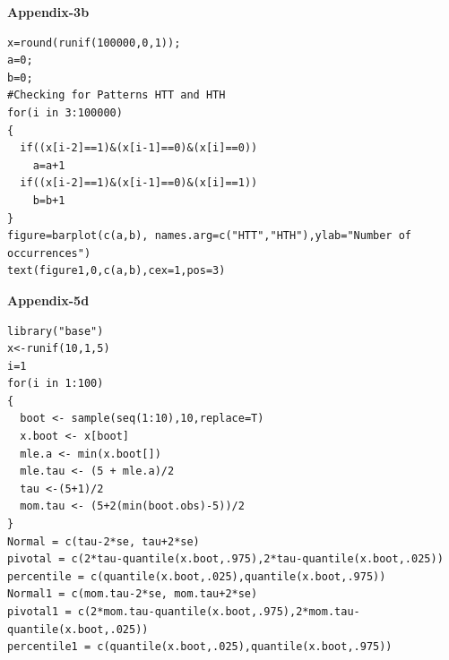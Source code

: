 \documentclass[11pt]{article}
\begin{document}
\begin{enumerate}
\fontsize{12}{12}
		\textbf{Appendix-3b}
		\fontsize{8}{12}
	\begin{verbatim}
x=round(runif(100000,0,1));
a=0;
b=0;
#Checking for Patterns HTT and HTH
for(i in 3:100000)
{
  if((x[i-2]==1)&(x[i-1]==0)&(x[i]==0))
    a=a+1
  if((x[i-2]==1)&(x[i-1]==0)&(x[i]==1))
    b=b+1
}
figure=barplot(c(a,b), names.arg=c("HTT","HTH"),ylab="Number of occurrences")
text(figure1,0,c(a,b),cex=1,pos=3)
\end{verbatim}

\fontsize{12}{12}
		\textbf{Appendix-5d}
		\fontsize{8}{12}
	\begin{verbatim}
library("base")
x<-runif(10,1,5)
i=1
for(i in 1:100)
{
  boot <- sample(seq(1:10),10,replace=T)
  x.boot <- x[boot]
  mle.a <- min(x.boot[])
  mle.tau <- (5 + mle.a)/2
  tau <-(5+1)/2
  mom.tau <- (5+2(min(boot.obs)-5))/2
}
Normal = c(tau-2*se, tau+2*se)
pivotal = c(2*tau-quantile(x.boot,.975),2*tau-quantile(x.boot,.025))
percentile = c(quantile(x.boot,.025),quantile(x.boot,.975))
Normal1 = c(mom.tau-2*se, mom.tau+2*se)
pivotal1 = c(2*mom.tau-quantile(x.boot,.975),2*mom.tau-quantile(x.boot,.025))
percentile1 = c(quantile(x.boot,.025),quantile(x.boot,.975))

\end{verbatim}







\end{enumerate}
\end{document}
